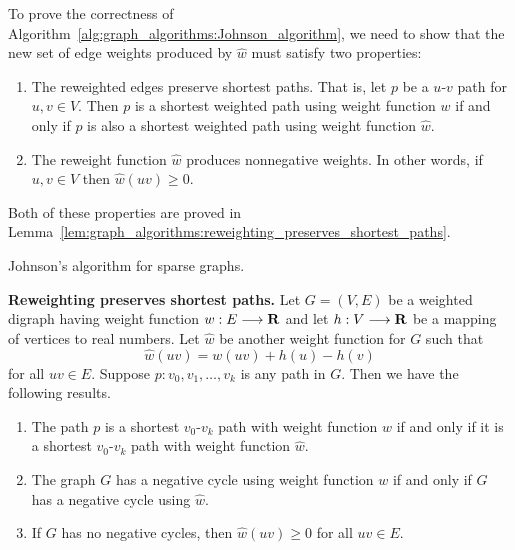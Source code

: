 To prove the correctness of
Algorithm~\ref{alg:graph_algorithms:Johnson_algorithm}, we need to
show that the new set of edge weights produced by $\hat{w}$ must
satisfy two properties:
\begin{enumerate}
\item The reweighted edges preserve shortest
  paths. That is, let $p$ be a $u$-$v$ path for $u,v \in V$. Then $p$
  is a shortest weighted path
  using weight function $w$ if and only if $p$ is also a shortest
  weighted path using weight function $\hat{w}$.

\item The reweight function $\hat{w}$ produces nonnegative
  weights. In other words, if $u,v \in V$
  then $\hat{w}(uv) \geq 0$.
\end{enumerate}
Both of these properties are proved in
Lemma~\ref{lem:graph_algorithms:reweighting_preserves_shortest_paths}.

\begin{algorithm}[!htbp]

\caption{Johnson's algorithm for sparse graphs.}
\label{alg:graph_algorithms:Johnson_algorithm}
\end{algorithm}

\begin{lemma}
\label{lem:graph_algorithms:reweighting_preserves_shortest_paths}
\textbf{Reweighting preserves shortest paths.}
Let $G = (V,E)$ be a weighted digraph having weight function
$w: E \longrightarrow \mathbf{R}$ and let $h: V \longrightarrow \mathbf{R}$ be a mapping of vertices to real
numbers. Let $\hat{w}$ be another weight function for $G$ such that
\[
\hat{w}(uv)
=
w(uv) + h(u) - h(v)
\]
for all $uv \in E$. Suppose $p: v_0, v_1, \dots, v_k$ is any path in
$G$. Then we have the following results.
\begin{enumerate}
\item The path $p$ is a shortest $v_0$-$v_k$ path with weight
  function $w$ if and only if it is a shortest
  $v_0$-$v_k$ path with weight function $\hat{w}$.

\item The graph $G$ has a negative cycle using
  weight function $w$ if and only if $G$ has a negative cycle using
  $\hat{w}$.

\item If $G$ has no negative cycles, then
  $\hat{w}(uv) \geq 0$ for all $uv \in E$.
\end{enumerate}
\end{lemma}

